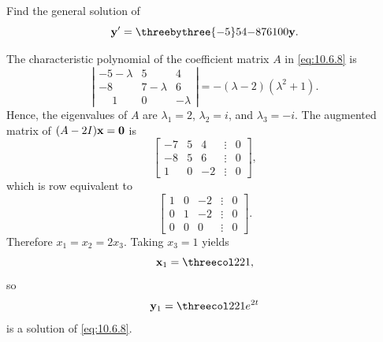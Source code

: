 \setcounter{example}{2}
\setcounter{equation}{7}
\begin{example}
  \label{example:10.6.3} \rm Find the general solution of
  \begin{equation}
    \label{eq:10.6.8}{\bf y}'=\threebythree{-5}54{-8}76100{\bf y}.
  \end{equation}
\end{example}
\begin{examplesolution}
\solution The characteristic polynomial of the coefficient matrix $A$ in \eqref{eq:10.6.8} is
\[
  \left|
  \begin{array}{ccc}
    -5-\lambda   & 5         & 4        \\
    -8           & 7-\lambda & 6        \\
    \phantom{-}1 & 0         & -\lambda
  \end{array}\right|=-(\lambda-2)(\lambda^{2}+1).
\]
Hence, the eigenvalues of $A$ are $\lambda_{1}=2$, $\lambda_{2}=i$, and $\lambda_{3}=-i$. The
augmented matrix of $(A-2I){\bf x=0}$ is
\[
  \left[
  \begin{array}{rrrcr}
    -7 & 5 & 4  & \vdots & 0 \\
    -8 & 5 & 6  & \vdots & 0 \\
    1  & 0 & -2 & \vdots & 0
  \end{array}\right],
\]
which is row equivalent to
\[
  \left[
  \begin{array}{rrrcr}
    1 & 0 & -2 & \vdots & 0 \\
    0 & 1 & -2 & \vdots & 0 \\
    0 & 0 & 0  & \vdots & 0
  \end{array}\right].
\]
Therefore $x_{1}=x_{2}=2x_{3}$. Taking $x_{3}=1$ yields
\[
  {\bf x}_{1}=\threecol221,
\]
so
\[
  {\bf y}_{1}=\threecol221e^{2t}
\]
is a solution of \eqref{eq:10.6.8}.


\end{examplesolution}
